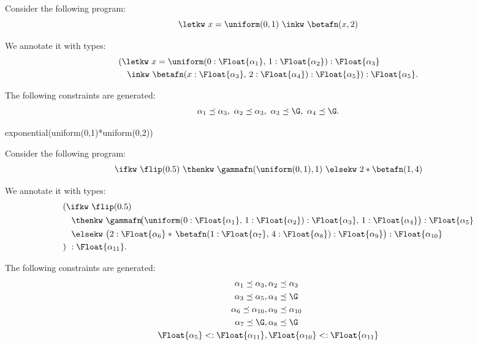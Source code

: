 \begin{example}
    Consider the following program:
    \[
        \letkw\ x = \uniform(0,1)\ \inkw\ \betafn(x, 2)
    \]

    We annotate it with types:
    \[
    \begin{aligned}
      &(\letkw\ x = \uniform(0 : \Float{\alpha_1},\, 1 : \Float{\alpha_2}) : \Float{\alpha_3} \\
      &\quad \inkw\ \betafn(x : \Float{\alpha_3},\, 2 : \Float{\alpha_4}) : \Float{\alpha_5}) : \Float{\alpha_5}.
    \end{aligned}
    \]

    The following constraints are generated:
    \begin{align*}
      \alpha_1 \preceq \alpha_3,\ \alpha_2 \preceq \alpha_3,\ \alpha_3 \preceq \G,\ \alpha_4 \preceq \G.
    \end{align*}

\end{example}

\begin{example}
  exponential(uniform(0,1)*uniform(0,2))
\end{example}

\begin{example}
    Consider the following program:
    \[
    \ifkw\ \flip(0.5)\ \thenkw\ \gammafn(\uniform(0,1), 1)\ \elsekw\ 2 * \betafn(1,4)
    \]
    
    We annotate it with types:
    \[
    \begin{aligned}
    &(\ifkw\ \flip(0.5) \\
    &\quad \thenkw\ \gammafn\!\big(
      \uniform(0 : \Float{\alpha_1},\, 1 : \Float{\alpha_2}) : \Float{\alpha_3},\,
      1 : \Float{\alpha_4}
    \big) : \Float{\alpha_5} \\
    &\quad \elsekw\ \big(
      2 : \Float{\alpha_6}
      *\,
      \betafn(1 : \Float{\alpha_7},\, 4 : \Float{\alpha_8}) : \Float{\alpha_9}
    \big) : \Float{\alpha_{10}} \\
    &)\ : \Float{\alpha_{11}}.
    \end{aligned}
    \]
    
  The following constraints are generated:
  \begin{align*}
      \alpha_1 \preceq \alpha_3 &, \alpha_2 \preceq \alpha_3 \\
      \alpha_3 \preceq \alpha_5 &, \alpha_4 \preceq \G \\
      \alpha_6 \preceq \alpha_{10} &, \alpha_9 \preceq \alpha_{10} \\
      \alpha_7 \preceq \G &, \alpha_8 \preceq \G \\
      \Float{\alpha_5} <: \Float{\alpha_{11}} &, \Float{\alpha_{10}} <: \Float{\alpha_{11}}
  \end{align*}
\end{example}


